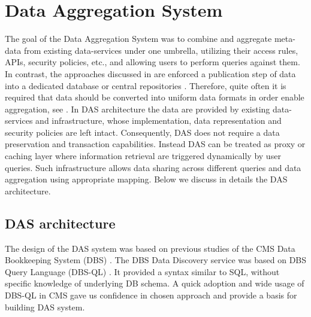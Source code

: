 \documentclass[1p,times]{elsarticle}
\begin{document}
\section{Data Aggregation System\label{DAS}}
The goal of the Data Aggregation System was to combine and
aggregate meta-data from existing data-services
under one umbrella, utilizing their access rules, APIs, security policies, etc., and
allowing users to perform queries against them. In contrast, the approaches
discussed in \cite{DBXplorer, QueryAnswer, FedDB} are
enforced a publication step of data into a dedicated database 
or central repositories \cite{iRODS}. Therefore, quite often it is required
that data should be converted into uniform data formats in order enable
aggregation, see \cite{OpenArchive}. In DAS architecture the data are provided
by existing data-services and infrastructure, whose implementation,
data representation and security policies are left intact. Consequently,
DAS does not require a data preservation and transaction capabilities. 
Instead DAS can be treated
as proxy or caching layer where information retrieval are triggered dynamically
by user queries. Such infrastructure allows data sharing across different queries and
data aggregation using appropriate mapping. Below we discuss in details the
DAS architecture.

\subsection{DAS architecture}
The design of the DAS system was based on previous studies of the CMS Data 
Bookkeeping System (DBS) \cite{DBS, DBS07}. The DBS Data Discovery service
\cite{DD} was based on DBS Query Language (DBS-QL) \cite{DBS-QL}. It provided
a syntax similar to SQL, without specific knowledge of underlying DB schema.
A quick adoption and wide usage of DBS-QL in CMS gave us confidence in chosen approach 
and provide a basis for building DAS system.
\end{document}
